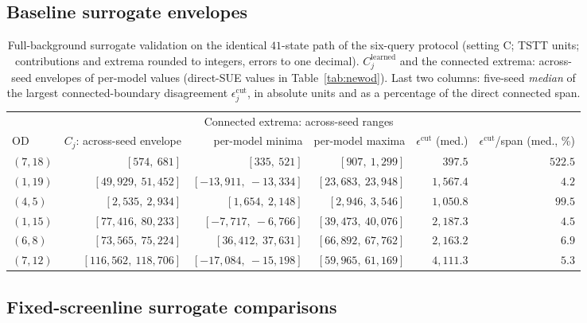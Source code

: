 \subsection{Baseline surrogate envelopes}\label{supp:baselineenvelopes}
\begin{table}[pos=htbp]
\caption{Full-background surrogate validation on the identical
$41$-state path of the six-query protocol (setting C; TSTT units;
contributions and extrema rounded to integers, errors to one
decimal). $C_j^{\mathrm{learned}}$ and the connected extrema:
across-seed envelopes of per-model values (direct-SUE values in
Table~\ref{tab:newod}). Last two columns: five-seed
\emph{median} of the largest connected-boundary disagreement
$\epsilon_j^{\mathrm{cut}}$, in absolute units and as a percentage of
the direct connected span.}
\label{tab:fullbgsurrogate}
\footnotesize
\begin{tabular*}{\tblwidth}{@{\extracolsep{\fill}}lrrrrr}
\toprule
& & \multicolumn{2}{c}{Connected extrema: across-seed ranges}\\
\cmidrule(lr){3-4}
OD & $C_j$: across-seed envelope & per-model minima & per-model maxima & $\epsilon^{\mathrm{cut}}$ (med.) & $\epsilon^{\mathrm{cut}}$/span (med., \%)\\
\midrule
$(7,18)$ & $[574,\ 681]$ & $[335,\ 521]$ & $[907,\ 1{,}299]$ & $397.5$ & $522.5$ \\
$(1,19)$ & $[49{,}929,\ 51{,}452]$ & $[-13{,}911,\ -13{,}334]$ & $[23{,}683,\ 23{,}948]$ & $1{,}567.4$ & $4.2$ \\
$(4,5)$ & $[2{,}535,\ 2{,}934]$ & $[1{,}654,\ 2{,}148]$ & $[2{,}946,\ 3{,}546]$ & $1{,}050.8$ & $99.5$ \\
$(1,15)$ & $[77{,}416,\ 80{,}233]$ & $[-7{,}717,\ -6{,}766]$ & $[39{,}473,\ 40{,}076]$ & $2{,}187.3$ & $4.5$ \\
$(6,8)$ & $[73{,}565,\ 75{,}224]$ & $[36{,}412,\ 37{,}631]$ & $[66{,}892,\ 67{,}762]$ & $2{,}163.2$ & $6.9$ \\
$(7,12)$ & $[116{,}562,\ 118{,}706]$ & $[-17{,}084,\ -15{,}198]$ & $[59{,}965,\ 61{,}169]$ & $4{,}111.3$ & $5.3$ \\
\bottomrule
\end{tabular*}
\end{table}



\subsection{Fixed-screenline surrogate comparisons}\label{supp:screenlinelearned}


